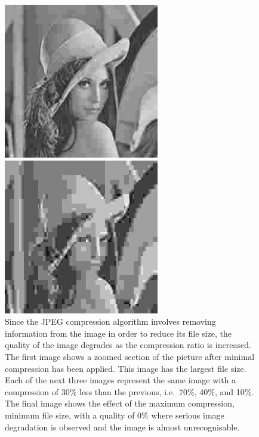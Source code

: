 \begin{figure}[ht]
\begin{minipage}[c]{0.19\linewidth}
	\end{minipage}
	\begin{minipage}[c]{0.19\linewidth}
		\centering
	 	\includegraphics[trim = 20mm 30mm 40mm 30mm, clip]{lena256x256_10.jpg}
	\end{minipage}
	\begin{minipage}[c]{0.19\linewidth}
		\centering
	 	\includegraphics[trim = 20mm 30mm 40mm 30mm, clip]{lena256x256_00.jpg}
	\end{minipage}
	\caption{Since the JPEG compression algorithm involves removing information from the image in order to reduce its file size, the quality of the image degrades as the compression ratio is increased. The first image shows a zoomed section of the picture after minimal compression has been applied. This image has the largest file size. Each of the next three images represent the same image with a compression of 30\% less than the previous, i.e.\ 70\%, 40\%, and 10\%. The final image shows the effect of the maximum compression, minimum file size, with a quality of 0\% where serious image degradation is observed and the image is almost unrecognisable.\label{fig:various_lena}}
\end{figure}

